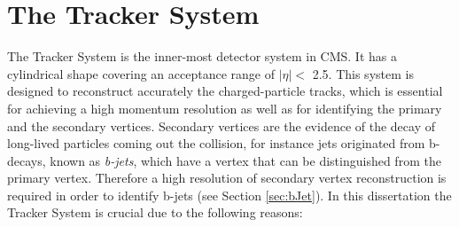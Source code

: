 

\section{The Tracker System}
\label{sec:Tracker}

\noindent The Tracker System is the inner-most detector system in CMS. It has 
a cylindrical shape covering an acceptance range of $|\eta| < $ 2.5. This system is 
designed to reconstruct accurately the charged-particle tracks, which is essential 
for achieving a high momentum resolution as well as for identifying the primary and the 
secondary vertices. Secondary vertices are the evidence of the decay 
of long-lived particles coming out the collision, for instance 
jets originated from b-decays, known as \textit{b-jets}, which have a vertex 
that can be distinguished from the primary vertex. Therefore 
a high resolution of secondary vertex reconstruction is required in order to 
identify b-jets (see Section \ref{sec:bJet}). In this dissertation the 
Tracker System is crucial due to the following reasons:


